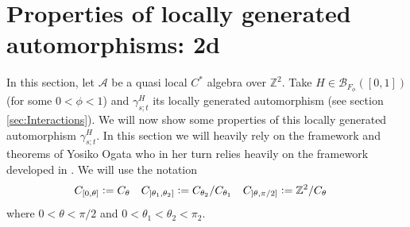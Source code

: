 \documentclass[12pt,a4paper,twoside]{article}
\newcommand{\defeq}{\vcentcolon=}
\newcommand{\BB}{\mathcal B}
\newcommand{\ZZ}{\mathbb Z}
\renewcommand{\AA}{\mathcal A}
\theoremstyle{definition}
\numberwithin{equation}{section}
\begin{document}
\section{Properties of locally generated automorphisms: 2d}
In this section, let $\AA$ be a quasi local $C^*$ algebra over $\ZZ^2$. Take $H\in\BB_{F_\phi}([0,1])$ (for some $0<\phi<1$) and $\gamma^H_{s;t}$ its locally generated automorphism (see section \ref{sec:Interactions}). We will now show some properties of this locally generated automorphism $\gamma^H_{s;t}$. In this section we will heavily rely on the framework and theorems of Yosiko Ogata \cite{ogata2021h3gmathbb} who in her turn relies heavily on the framework developed in \cite{doi:10.1063/1.5095769}. We will use the notation
\begin{align}
	C_{[0,\theta]}&\defeq C_{\theta}&C_{]\theta_1,\theta_2]}&\defeq C_{\theta_2}/C_{\theta_1}&C_{]\theta,\pi/2]}&\defeq \ZZ^2/C_{\theta}
\end{align}
where $0<\theta<\pi/2$ and $0<\theta_1<\theta_2<\pi_2$.
\end{document}
